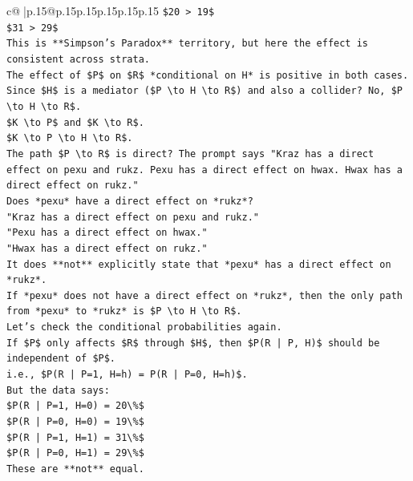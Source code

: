 \documentclass{article}
\begin{document}
{\begin{supertabular}{c@{$\;$}|p{.15\linewidth}@{}p{.15\linewidth}p{.15\linewidth}p{.15\linewidth}p{.15\linewidth}p{.15\linewidth}}
{{{\texttt{\$20 > 19\$} \\
\texttt{\$31 > 29\$} \\
\texttt{This is **Simpson's Paradox** territory, but here the effect is consistent across strata.} \\
\texttt{The effect of \$P\$ on \$R\$ *conditional on H* is positive in both cases.} \\
\texttt{Since \$H\$ is a mediator (\$P \textbackslash{}to H \textbackslash{}to R\$) and also a collider? No, \$P \textbackslash{}to H \textbackslash{}to R\$.} \\
\texttt{\$K \textbackslash{}to P\$ and \$K \textbackslash{}to R\$.} \\
\texttt{\$K \textbackslash{}to P \textbackslash{}to H \textbackslash{}to R\$.} \\
\texttt{The path \$P \textbackslash{}to R\$ is direct? The prompt says "Kraz has a direct effect on pexu and rukz. Pexu has a direct effect on hwax. Hwax has a direct effect on rukz."} \\
\texttt{Does *pexu* have a direct effect on *rukz*?} \\
\texttt{"Kraz has a direct effect on pexu and rukz."} \\
\texttt{"Pexu has a direct effect on hwax."} \\
\texttt{"Hwax has a direct effect on rukz."} \\
\texttt{It does **not** explicitly state that *pexu* has a direct effect on *rukz*.} \\
\texttt{If *pexu* does not have a direct effect on *rukz*, then the only path from *pexu* to *rukz* is \$P \textbackslash{}to H \textbackslash{}to R\$.} \\
\texttt{Let's check the conditional probabilities again.} \\
\texttt{If \$P\$ only affects \$R\$ through \$H\$, then \$P(R | P, H)\$ should be independent of \$P\$.} \\
\texttt{i.e., \$P(R | P=1, H=h) = P(R | P=0, H=h)\$.} \\
\texttt{But the data says:} \\
\texttt{\$P(R | P=1, H=0) = 20\textbackslash{}\%\$} \\
\texttt{\$P(R | P=0, H=0) = 19\textbackslash{}\%\$} \\
\texttt{\$P(R | P=1, H=1) = 31\textbackslash{}\%\$} \\
\texttt{\$P(R | P=0, H=1) = 29\textbackslash{}\%\$} \\
\texttt{These are **not** equal.} \\
}}}
\end{supertabular}}
\end{document}
